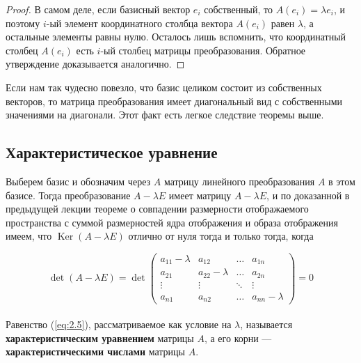 \documentclass[11pt]{article}
\DeclareMathOperator{\Ker}{Ker}
\begin{document}
\begin{proof}
    В самом деле, если базисный вектор $e_i$ собственный, то $A(e_i) = \lambda e_i$, и поэтому $i$-ый элемент координатного столбца вектора $A(e_i)$ равен $\lambda$, а остальные элементы равны нулю. Осталось лишь вспомнить, что координатный столбец $A(e_i)$ есть $i$-ый столбец матрицы преобразования. Обратное утверждение доказывается аналогично.
\end{proof}

\begin{remark}
    Если нам так чудесно повезло, что базис целиком состоит из собственных векторов, то матрица преобразования имеет диагональный вид с собственными значениями на диагонали. Этот факт есть легкое следствие теоремы выше.
\end{remark}

\subsection{Характеристическое уравнение}

Выберем базис и обозначим через $A$ матрицу линейного преобразования $A$ в этом базисе. Тогда преобразование $A - \lambda E$ имеет матрицу $A - \lambda E$, и по доказанной в предыдущей лекции теореме о совпадении размерности отображаемого пространства с суммой размерностей ядра отображения и образа отображения имеем, что $\Ker(A - \lambda E)$ отлично от нуля тогда и только тогда, когда 

\begin{equation} \label{eq:2.5}
    \det (A - \lambda E) = \det
    \begin{pmatrix}
        a_{11} - \lambda & a_{12} & \ldots & a_{1n} \\
        a_{21} & a_{22} - \lambda & \ldots & a_{2n} \\
        \vdots & \vdots & \ddots & \vdots \\
        a_{n1} & a_{n2} & \ldots & a_{nn} - \lambda
    \end{pmatrix}
    = 0
\end{equation} \leavevmode
\\
Равенство (\ref{eq:2.5}), рассматриваемое как условие на $\lambda$, называется \textbf{характеристическим уравнением} матрицы $A$, а его корни --- \textbf{характеристическими числами} матрицы $A$.
\end{document}

